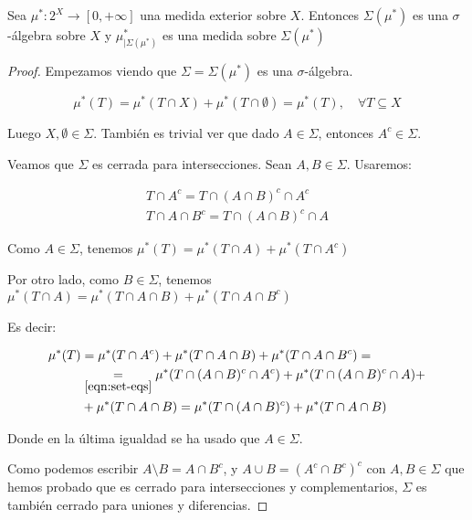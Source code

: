 \begin{theorem}
 Sea $\mu^\ast : 2^X \rightarrow [0, +\infty]$ una medida exterior sobre $X$. Entonces $\Sigma(\mu^\ast)$
 es una $\sigma$-álgebra sobre $X$ y $\mu^\ast_{|\Sigma(\mu^\ast)}$ es una medida sobre $\Sigma(\mu^\ast)$
 
 \label{th:outer-to-measure}
\end{theorem}

\begin{proof}
 Empezamos viendo que $\Sigma = \Sigma(\mu^\ast)$ es una $\sigma$-álgebra.
 
 \[\mu^\ast(T) = \mu^\ast(T\cap X) + \mu^\ast(T\cap \emptyset) = \mu^\ast(T), \quad \forall T\subseteq X\]
 
 Luego $X,\emptyset \in \Sigma$. También es trivial ver que dado $A\in \Sigma$, entonces $A^c \in \Sigma$.
 
 Veamos que $\Sigma$ es cerrada para intersecciones. Sean $A, B\in \Sigma$. Usaremos:
 
 \begin{align}
  T\cap A^c = T\cap (A\cap B)^c \cap A^c \nonumber\\
  T\cap A \cap B^c = T \cap (A\cap B)^c \cap A
  \label{eqn:set-eqs}\tag{$\ast$}
 \end{align}

 Como $A\in \Sigma$, tenemos $\mu^\ast(T) = \mu^\ast(T\cap A) + \mu^\ast(T\cap A^c)$
 
 Por otro lado, como $B\in \Sigma$, tenemos $\mu^\ast(T\cap A) = \mu^\ast(T\cap A\cap B) + \mu^\ast(T\cap A \cap B^c)$
 
 Es decir:
 
 \begin{align*}
  \mu^\ast(T) &= \mu^\ast(T\cap A^c) + \mu^\ast(T\cap A \cap B) + \mu^\ast(T\cap A \cap B^c) = \\
  & \underset{\eqref{eqn:set-eqs}}{=} \mu^\ast(T\cap (A\cap B)^c \cap A^c) + \mu^\ast(T \cap (A\cap B)^c \cap A) +\\
  &+ \mu^\ast(T\cap A \cap B) = \mu^\ast(T\cap (A \cap B)^c) + \mu^\ast(T\cap A \cap B)
 \end{align*}

 Donde en la última igualdad se ha usado que $A\in \Sigma$.
 
 Como podemos escribir $A\setminus B = A\cap B^c$, y $A\cup B = (A^c \cap B^c)^c$ con $A, B \in \Sigma$ que
 hemos probado que es cerrado para intersecciones y complementarios, $\Sigma$ es también cerrado para
 uniones y diferencias.
 

\end{proof}
